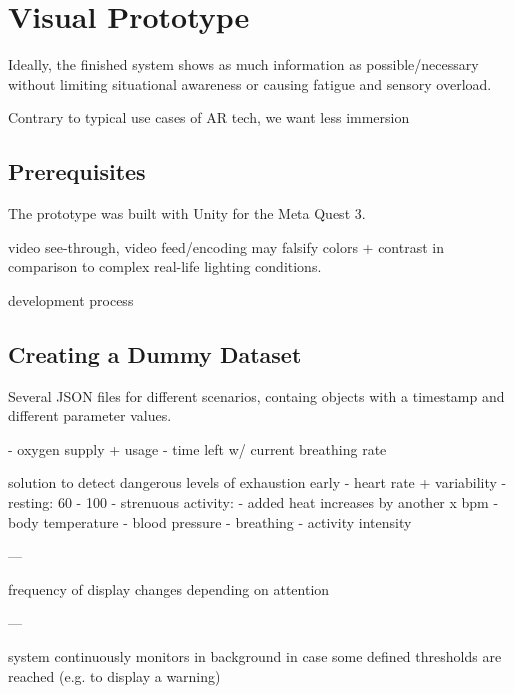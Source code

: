 \section{Visual Prototype}

Ideally, the finished system shows as much information as possible/necessary without limiting situational awareness or causing fatigue and sensory overload.

Contrary to typical use cases of AR tech, we want less immersion

\subsection{Prerequisites}

The prototype was built with Unity for the Meta Quest 3.

video see-through, video feed/encoding may falsify colors + contrast in comparison to complex real-life lighting conditions.

development process

\subsection{Creating a Dummy Dataset}

Several JSON files for different scenarios, containg objects with a timestamp and different parameter values.

- oxygen supply + usage
    - time left w/ current breathing rate

solution to detect dangerous levels of exhaustion early
- heart rate + variability
    - resting: 60 - 100
    - strenuous activity:
    - added heat increases by another x bpm
- body temperature
- blood pressure
- breathing
- activity intensity

---

frequency of display changes depending on attention

---

system continuously monitors in background in case some defined thresholds are reached (e.g. to display a warning)